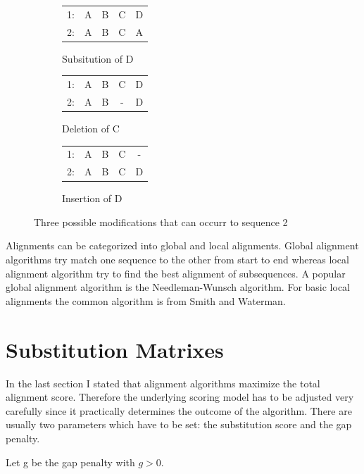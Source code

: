 \begin{figure}[h]
	\centering
	\begin{subfigure}[b]{0.3\textwidth}
	\begin{tabular}{c|cccc}
		1: &A&B&C&D\\
		2: &A&B&C&A\\
	\end{tabular}
	\caption{Subsitution of D} 
	\end{subfigure}
	\begin{subfigure}[b]{0.3\textwidth}
	\begin{tabular}{c|cccc}
		1:&A&B&C&D\\
		2:&A&B&-&D\\
	\end{tabular}
	\caption{Deletion of C} 
	\end{subfigure}
	\begin{subfigure}[b]{0.3\textwidth}
	\begin{tabular}{c|cccc}
		1:&A&B&C&-\\
		2:&A&B&C&D\\
	\end{tabular}
	\caption{Insertion of D}
	\end{subfigure}
	\caption{Three possible modifications that can occurr to sequence 2}
	\label{fig:alignmentbasic}
\end{figure}

Alignments can be categorized into global and local alignments. Global alignment algorithms try match one sequence to the other from start to end whereas local alignment algorithm try to find the best alignment of subsequences. 
A popular global alignment algorithm is the Needleman-Wunsch algorithm\cite{needleman1970}. For basic local alignments the common algorithm is from Smith and Waterman\cite{waterman1981}.

\section{Substitution Matrixes}
\label{sec:foundationsubstitutionmatrix}
In the last section I stated that alignment algorithms maximize the total alignment score. Therefore the underlying scoring model has to be adjusted very carefully since it practically determines the outcome of the algorithm.
There are usually two parameters which have to be set: the substitution score and the gap penalty. 

\begin{definition}
	\item Let g be the gap penalty with $g>0$.
	\label{def:gappenalty}
\end{definition}

